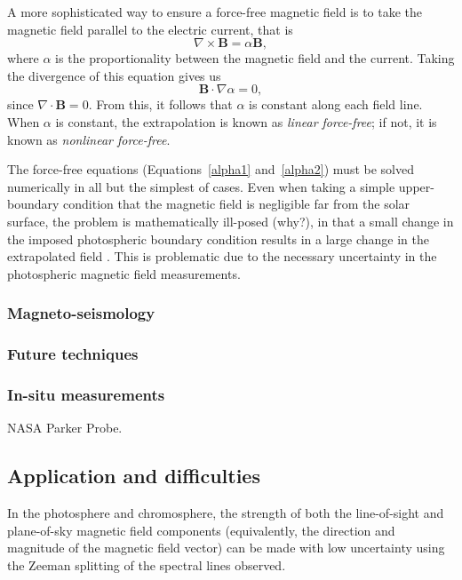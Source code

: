 \documentclass[12pt]{../style-files/ociamthesis}
\begin{document}
A more sophisticated way to ensure a force-free magnetic field is to take the magnetic field parallel to the electric current, that is
\begin{equation}
\nabla \times \mathbf{B} = \alpha \mathbf{B},
\label{alpha1}
\end{equation}
where $\alpha$ is the proportionality between the magnetic field and the current. Taking the divergence of this equation gives us
\begin{equation}
\mathbf{B} \cdot \nabla\alpha = 0,
\label{alpha2}
\end{equation}
since $\nabla \cdot \mathbf{B} = 0$. From this, it follows that $\alpha$ is constant along each field line. When $\alpha$ is constant, the extrapolation is known as \textit{linear force-free}; if not, it is known as \textit{nonlinear force-free}.

The force-free equations (Equations~\eqref{alpha1} and~\eqref{alpha2}) must be solved numerically in all but the simplest of cases. Even when taking a simple upper-boundary condition that the magnetic field is negligible far from the solar surface, the problem is mathematically ill-posed (why?), in that a small change in the imposed photospheric boundary condition results in a large change in the extrapolated field \citep{low_etal90}. This is problematic due to the necessary uncertainty in the photospheric magnetic field measurements.


\subsubsection{Magneto-seismology}



\subsubsection{Future techniques}
\subsubsection{In-situ measurements}
NASA Parker Probe.

\subsection{Application and difficulties}
In the photosphere and chromosphere, the strength of both the line-of-sight and plane-of-sky magnetic field components (equivalently, the direction and magnitude of the magnetic field vector) can be made with low uncertainty using the Zeeman splitting of the spectral lines observed.
\end{document}
